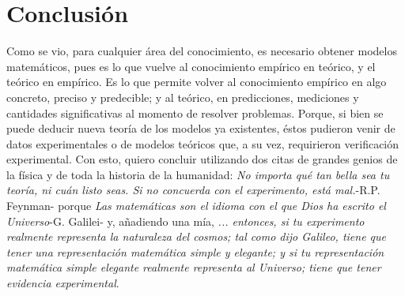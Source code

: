 \documentclass[12pt,oneside,FLEQN]{report}
\begin{document}
{\chapter{Conclusión}
Como se vio, para cualquier área del conocimiento, es necesario obtener modelos matemáticos, pues es lo que vuelve al conocimiento empírico en teórico, y el teórico en empírico. Es lo que permite volver al conocimiento empírico en algo concreto, preciso y predecible; y al teórico, en predicciones, mediciones y cantidades significativas al momento de resolver problemas. Porque, si bien se puede deducir nueva teoría de los modelos ya existentes, éstos pudieron venir de datos experimentales o de modelos teóricos que, a su vez, requirieron verificación experimental. Con esto, quiero concluir utilizando dos citas de grandes genios de la física y de toda la historia de la humanidad:
{\it No importa qué tan bella sea tu teoría, ni cuán listo seas. Si no concuerda con el experimento, está mal.}-R.P. Feynman- porque {\it Las matemáticas son el idioma con el que Dios ha escrito el Universo}-G. Galilei- y, añadiendo una mía, {\it... entonces, si tu experimento realmente representa la naturaleza del cosmos; tal como dijo Galileo, tiene que tener una representación matemática simple y elegante; y si tu representación matemática simple  elegante realmente representa al Universo; tiene que tener evidencia experimental}. 

}
\end{document}
